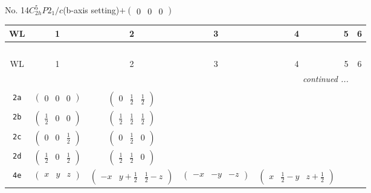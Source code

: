 \documentclass[fleqn,9pt,landscape]{jsarticle}
\begin{document}
\newpage
No. 14\quad$C_{2h}^{5}$\quad$P2_1/c$\quad(b-axis setting)\quad[ monoclinic ]\quad$+\begin{pmatrix} 0 & 0 & 0 \end{pmatrix}$
\begin{center}
\renewcommand{\arraystretch}{1.2}
\begin{longtable}{ccccccc}
 \hline \hline
WL & 1 & 2 & 3 & 4 & 5 & 6 \\ \hline \endfirsthead

\multicolumn{6}{l}{\tablename\ \thetable{}} \\
 \hline \hline
WL & 1 & 2 & 3 & 4 & 5 & 6 \\ \hline \endhead

 \hline \hline
\multicolumn{6}{r}{\footnotesize\it continued ...} \\ \endfoot

 \hline \hline
\multicolumn{6}{r}{} \\ \endlastfoot

{\tt 2a} & $ \begin{pmatrix} 0 & 0 & 0 \end{pmatrix} $ & $ \begin{pmatrix} 0 & \frac{1}{2} & \frac{1}{2} \end{pmatrix} $ & $  $ & $  $ \\ \hline
{\tt 2b} & $ \begin{pmatrix} \frac{1}{2} & 0 & 0 \end{pmatrix} $ & $ \begin{pmatrix} \frac{1}{2} & \frac{1}{2} & \frac{1}{2} \end{pmatrix} $ & $  $ & $  $ \\ \hline
{\tt 2c} & $ \begin{pmatrix} 0 & 0 & \frac{1}{2} \end{pmatrix} $ & $ \begin{pmatrix} 0 & \frac{1}{2} & 0 \end{pmatrix} $ & $  $ & $  $ \\ \hline
{\tt 2d} & $ \begin{pmatrix} \frac{1}{2} & 0 & \frac{1}{2} \end{pmatrix} $ & $ \begin{pmatrix} \frac{1}{2} & \frac{1}{2} & 0 \end{pmatrix} $ & $  $ & $  $ \\ \hline
{\tt 4e} & $ \begin{pmatrix} x & y & z \end{pmatrix} $ & $ \begin{pmatrix} - x & y + \frac{1}{2} & \frac{1}{2} - z \end{pmatrix} $ & $ \begin{pmatrix} - x & - y & - z \end{pmatrix} $ & $ \begin{pmatrix} x & \frac{1}{2} - y & z + \frac{1}{2} \end{pmatrix} $ \\
\end{longtable}
\end{center}
\end{document}
